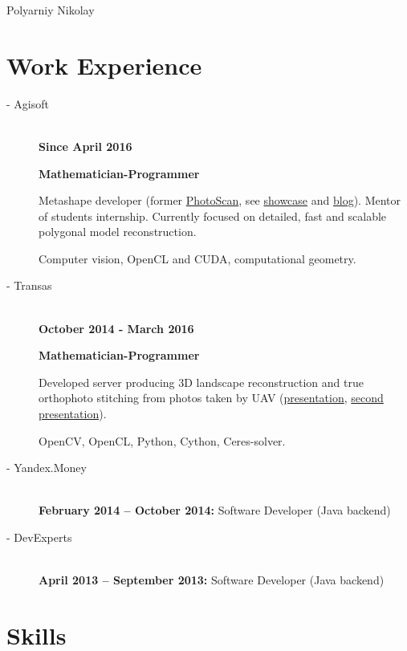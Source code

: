 \documentclass[11pt,oneside]{article}
\newcommand{\hhref}[2]{\href{#1}{\color{blue}#2}}
\begin{document}
\begin{center}
	{\huge Polyarniy Nikolay}
\end{center}


\vspace{-9pt}
\section*{\textbf{Work Experience}}
\vspace{-9pt}

\begin{description}
  \item[ - Agisoft] \hfill \\
    \textbf{Since April 2016}
  
    \textbf{Mathematician-Programmer}
    
    Metashape developer (former \hhref{https://en.wikipedia.org/wiki/PhotoScan}{PhotoScan}, see \hhref{http://www.agisoft.com/community/showcase/}{showcase} and \hhref{http://www.agisoft.com/community/blog/}{blog}).
    Mentor of students internship.
    Currently focused on detailed, fast and scalable polygonal model reconstruction.

    Computer vision, OpenCL and CUDA, computational geometry.
  \item[ - Transas] \hfill \\
    \textbf{October 2014 - March 2016}

    \textbf{Mathematician-Programmer}

    Developed server producing 3D landscape reconstruction and true orthophoto stitching from photos taken by UAV (\hhref{http://polarnick239.github.io/old/cv/Monoceros1.pdf}{presentation}, \hhref{http://polarnick239.github.io/old/cv/Monoceros2.pdf}{second presentation}).

    OpenCV, OpenCL, Python, Cython, Ceres-solver.
  \item[ - Yandex.Money] \hfill \\
    \textbf{February 2014 – October 2014:} Software Developer (Java backend)
  \item[ - DevExperts] \hfill \\
    \textbf{April 2013 – September 2013:} Software Developer (Java backend)

\end{description}


\vspace{-9pt}
\section*{\textbf{Skills}}
\vspace{-9pt}
\end{document}
